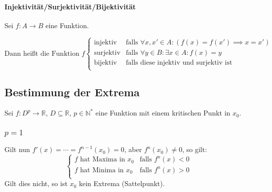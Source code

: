 			\paragraph{Injektivität/Surjektivität/Bijektivität}
				Sei $ f : A \rightarrow B $ eine Funktion.

				\begin{equation*}
					\text{Dann heißt die Funktion } f
					\begin{cases}
						\text{injektiv}  & \text{falls } \forall x, x' \in A : (f(x) = f(x') \implies x = x') \\
						\text{surjektiv} & \text{falls } \forall y \in B : \exists x \in A : f(x) = y         \\
						\text{bijektiv}  & \text{falls diese injektiv und surjektiv ist}                      \\
					\end{cases}
				\end{equation*}

		\subsection{Bestimmung der Extrema}
			Sei $ f : D ^ p \rightarrow \mathbb{R} $, $ D \subseteq \mathbb{R} $, $ p \in \mathbb{N} ^ * $ eine Funktion mit einem kritischen Punkt in $ x _ 0 $.

			\subsubsection{$ p = 1 $}
				Gilt nun $ f'(x) = \cdots = f ^ { n - 1 } (x _ 0) = 0 $, aber $ f ^ n (x _ 0) \neq 0 $, so gilt:
				\begin{equation*}
					\begin{cases}
						f \text{ hat Maxima in } x _ 0 & \text{falls } f ^ n (x) < 0 \\
						f \text{ hat Minima in } x _ 0 & \text{falls } f ^ n (x) > 0 \\
					\end{cases}
				\end{equation*}
				Gilt dies nicht, so ist $ x _ 0 $ kein Extrema (Sattelpunkt).

